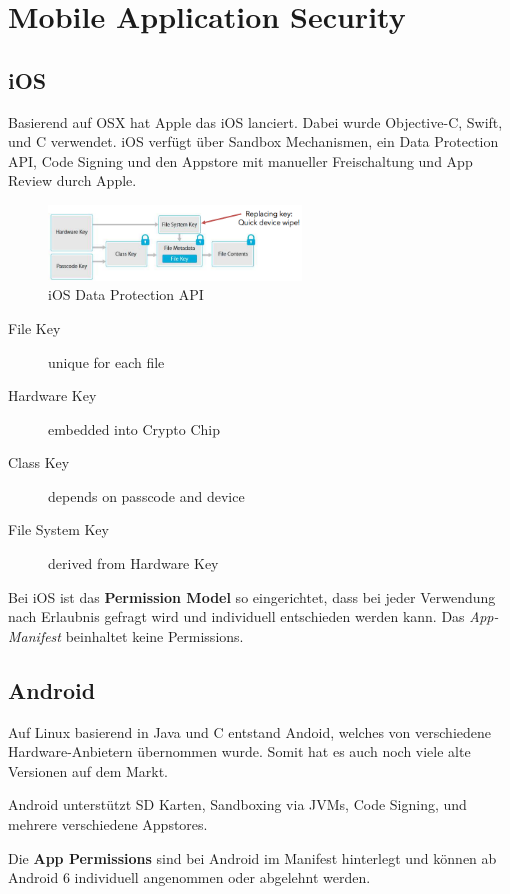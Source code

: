 \section{Mobile Application Security}

\subsection{iOS}
Basierend auf OSX hat Apple das iOS lanciert. Dabei wurde Objective-C, Swift, und C verwendet. iOS verfügt über Sandbox Mechanismen, ein Data Protection API, Code Signing und den Appstore mit manueller Freischaltung und App Review durch Apple.

\begin{figure}[H]
	\centering
	\includegraphics[width=0.6\textwidth]{./img/mobileappsecurity_iOS-DataProtectionAPI}
	\caption{iOS Data Protection API}
\end{figure}

\begin{description}
	\item[File Key] unique for each file
	\item[Hardware Key] embedded into Crypto Chip
	\item[Class Key] depends on passcode and device
	\item[File System Key] derived from Hardware Key
\end{description}

Bei iOS ist das \textbf{Permission Model} so eingerichtet, dass bei jeder Verwendung nach Erlaubnis gefragt wird und individuell entschieden werden kann. Das \textit{App-Manifest} beinhaltet keine Permissions.

\subsection{Android}
Auf Linux basierend in Java und C entstand Andoid, welches von verschiedene Hardware-Anbietern übernommen wurde. Somit hat es auch noch viele alte Versionen auf dem Markt.

Android unterstützt SD Karten, Sandboxing via JVMs, Code Signing, und mehrere verschiedene Appstores.

Die \textbf{App Permissions} sind bei Android im Manifest hinterlegt und können ab Android 6 individuell angenommen oder abgelehnt werden.

